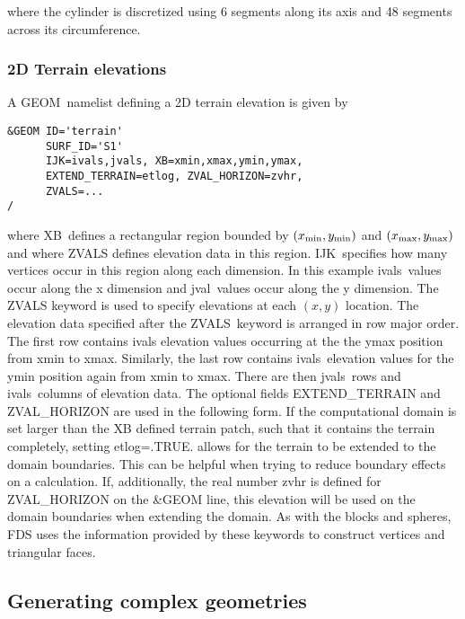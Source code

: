\documentclass[12pt]{article}
\begin{document}
where the cylinder is discretized using 6 segments along its axis and 48 segments across its circumference.


\subsubsection{2D Terrain elevations}
A {\ct GEOM}\ namelist defining a 2D terrain elevation is given by

\begin{verbatim}
&GEOM ID='terrain'
      SURF_ID='S1'
      IJK=ivals,jvals, XB=xmin,xmax,ymin,ymax, 
      EXTEND_TERRAIN=etlog, ZVAL_HORIZON=zvhr, 
      ZVALS=...
/
\end{verbatim}

\noindent where {\ct XB}\ defines a rectangular region bounded by $(x_{\rm min}, y_{\rm min})$  and $(x_{\rm max}, y_{\rm max})$
and where {\ct ZVALS} defines elevation data in this region.
{\ct IJK}\ specifies how many vertices occur in this region along each dimension.
In this example {\ct ivals}\ values occur along the x dimension and {\ct jval}\ values occur along the y dimension.
The {\ct ZVALS} keyword is used to specify elevations at each $(x,y)$ location.
The elevation data specified after the {\ct ZVALS}\ keyword is arranged in row major order.
The first row contains {\ct ivals} elevation values occurring at the the ymax position from xmin to xmax.
Similarly, the last row contains
{\ct ivals}\ elevation values for the ymin position again from xmin to xmax.
There are then {\ct jvals}\ rows and {\ct ivals}\ columns of elevation data.
The optional fields {\ct EXTEND\_TERRAIN} and {\ct ZVAL\_HORIZON} are used in the following form. If the computational domain is set larger than the {\ct XB} defined terrain patch, such that it contains the terrain completely, setting {\ct etlog=.TRUE.} allows for the terrain to be extended to the domain boundaries. This can be helpful when trying to reduce boundary effects on a calculation.
If, additionally, the real number {\ct zvhr} is defined for {\ct ZVAL\_HORIZON} on the {\ct \&GEOM} line, this elevation will be used on the domain boundaries when extending the domain.
As with the blocks and spheres, FDS uses the information provided by these keywords to construct
vertices and triangular faces.

\subsection{Generating complex geometries}
\end{document}
